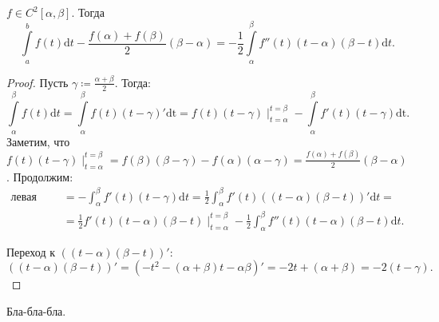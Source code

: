 \begin{lemma}
    $f \in C^2[\alpha, \beta]$. Тогда  \[\int\limits_a^b f(t)\mathrm{d}t - \frac{f(\alpha) + f(\beta)}{2}(\beta - \alpha) = -\frac{1}{2} \int\limits_\alpha^\beta f''(t)(t-\alpha)(\beta-t)\mathrm{d}t.\]
\end{lemma}
\begin{proof}
    Пусть  $\gamma \coloneqq \frac{\alpha + \beta}{2}$. Тогда: \[
        \int\limits_\alpha^\beta f(t) \mathrm{d}t = \int\limits_\alpha^\beta f(t)(t-\gamma)' \mathrm{dt} = f(t)(t-\gamma)\mid_{t=\alpha}^{t=\beta} - \int\limits_\alpha^\beta f'(t)(t-\gamma)\mathrm{dt}
    .\] 
    Заметим, что $f(t)(t-\gamma)\mid_{t=\alpha}^{t=\beta} = f(\beta)(\beta - \gamma) - f(\alpha)(\alpha - \gamma) = \frac{f(\alpha) + f(\beta)}{2}(\beta - \alpha)$. Продолжим: \begin{align*}
        \text{левая часть} &= -\int_{\alpha}^\beta f'(t)(t-\gamma)\mathrm{d}t = \frac{1}{2}\int_\alpha^\beta f'(t)((t-\alpha)(\beta-t))' \mathrm{d}t = \\ &= \frac{1}{2}f'(t)(t-\alpha)(\beta - t)\mid_{t=\alpha}^{t=\beta} - \frac{1}{2} \int_\alpha^\beta f''(t)(t-\alpha)(\beta-t)\mathrm{d}t
    .\end{align*}

    Переход к $((t-\alpha)(\beta - t))'$: \[
        ((t-\alpha)(\beta - t))' = (-t^2 - (\alpha + \beta)t - \alpha\beta)' = -2t+(\alpha + \beta) = -2(t-\gamma)
    .\] 
\end{proof}
\begin{remark}
    Бла-бла-бла.
\end{remark}

